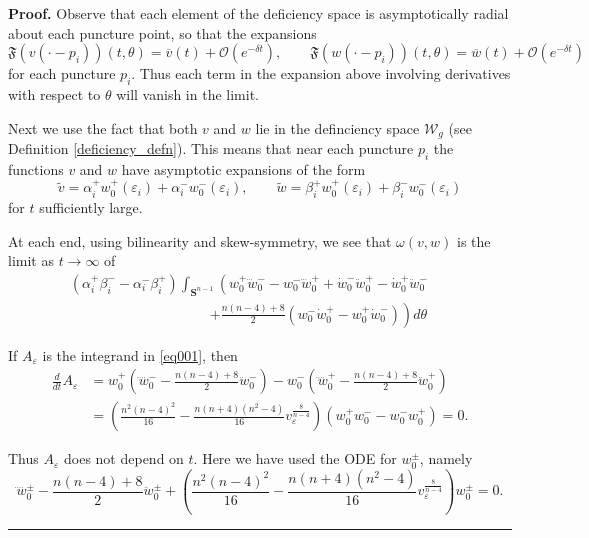 \documentclass[10pt,a4paper]{amsart}
\newcommand{\Ss}{\mathbf{S}}
\newenvironment{proof}[1][Proof]{\noindent\textbf{#1.} }{\hfill\rule{0.5em}{0.5em}}
\begin{document}
\begin{proof}
 Observe that each element of the deficiency space is asymptotically radial about 
 each puncture point, so that the expansions 
 $$\mathfrak{F} (v(\cdot - p_i)) (t,\theta) = \overline{v}(t) + \mathcal{O} (e^{-\delta t}), 
 \qquad \mathfrak{F}(w(\cdot - p_i)) (t,\theta) = \overline{w}(t) + \mathcal{O}(e^{-\delta t})$$
 for each puncture $p_i$. Thus each term in the expansion above involving derivatives with 
 respect to $\theta$ will vanish in the limit. 

 Next we use the fact that both $v$ and $w$ lie in the definciency space 
 $\mathcal{W}_g$ (see Definition \ref{deficiency_defn}). This means that near each puncture $p_i$ the 
 functions $v$ and $w$ have asymptotic expansions of the form 
 \begin{equation} \label{expansion_def_space}
 \widetilde v = \alpha_i^+ w_0^+(\varepsilon_i) + \alpha_i^- w_0^-(\varepsilon_i), \qquad 
 \widetilde w = \beta_i^+ w_0^+(\varepsilon_i) + \beta_i^- w_0^-(\varepsilon_i)  
 \end{equation} 
 for $t$ sufficiently large. 


 At each end, using bilinearity and skew-symmetry, we see that $\omega(v,w)$ is the limit as $t\rightarrow\infty$ of
\begin{eqnarray}\label{eq001}
    (\alpha_i^+\beta_i^--\alpha_i^-\beta_i^+)\int_{\Ss^{n-1}}\left(w_0^+ \dddot {w}_0^- 
     -  w_0^- \dddot {w}_0^+ + \dot {w}_0^- \ddot {w}_0^+ - \dot {w}_0^+ \ddot {w}_0^-
     \right .&& \\ \nonumber 
     \qquad \qquad \qquad \qquad \qquad  \left .  + \frac{n(n-4)+8}{2} (w_0^- \dot {w}_0^+ - w_0^+ \dot {w}_0^-)\right)d\theta & & 
\end{eqnarray}

If $A_\varepsilon$ is the integrand in \eqref{eq001}, then
\begin{align*}
\frac{d}{dt}A_\varepsilon
& = w_0^+ \left(\ddddot w_0^--\frac{n(n-4)+8}{2}\ddot w_0^-\right) - w_0^- \left(\ddddot w_0^+-\frac{n(n-4)+8}{2}\ddot w_0^+\right)\\
& =\left ( 
\frac{n^2(n-4)^2}{16} - \frac{n(n+4)(n^2-4)}{16} v_\varepsilon^{\frac{8}{n-4}} \right )\left(w_0^+w_0^--w_0^-w_0^+\right)=0.
\end{align*}

Thus $A_\varepsilon$ does not depend on $t$. Here we have used the ODE for $w_0^\pm$, namely 
$$\ddddot w_0^\pm - \frac{n(n-4)+8}{2} \ddot w_0^\pm + \left ( 
\frac{n^2(n-4)^2}{16} - \frac{n(n+4)(n^2-4)}{16} v_\varepsilon^{\frac{8}{n-4}} \right ) w_0^\pm 
= 0.$$


\end{proof}
\end{document}
